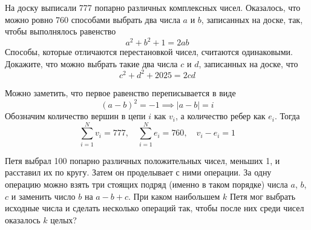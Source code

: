 \documentclass[11pt, a4paper]{common/document_template}
\begin{document}
\begin{exercise}
На доску выписали 777 попарно различных комплексных чисел. Оказалось, что можно ровно 760 способами выбрать два числа $a$ и $b$, записанных на доске, так, чтобы выполнялось равенство 
$$a^{2} + b^{2} + 1 = 2ab
$$
Способы, которые отличаются перестановкой чисел, считаются одинаковыми. Докажите, что можно выбрать такие
два числа $c$ и $d$, записанных на доске, что
$$
c^{2} + d^{2} + 2025 = 2cd
$$
\end{exercise}

\begin{Solution}
Можно заметить, что первое равенство переписывается в виде
$$
(a - b)^{2} = -1 \implies |a - b| = i
$$
Обозначим количество вершин в цепи $i$ как $v_{i}$, а количество ребер как $e_{i}$. Тогда
$$
\sum_{i = 1}^{N} v_{i} = 777, \quad \sum_{i = 1}^{N} e_{i} = 760, \quad v_{i} - e_{i} = 1
$$
\end{Solution}

\begin{exercise}
Петя выбрал 100 попарно различных положительных чисел, меньших 1, и расставил их по кругу. Затем он проделывает с ними операции. За одну операцию можно взять
три стоящих подряд (именно в таком порядке) числа $a$, $b$, $c$ и заменить число $b$ на $a - b + c$. При каком наибольшем $k$ Петя мог выбрать исходные числа и сделать несколько операций так, чтобы после них среди чисел оказалось $k$ целых?
\end{exercise}
\end{document}
